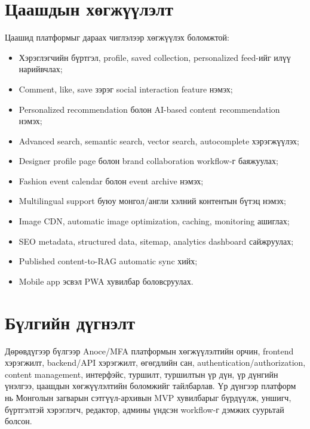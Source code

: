 \section{Цаашдын хөгжүүлэлт}
Цаашид платформыг дараах чиглэлээр хөгжүүлэх боломжтой:
\begin{itemize}
  \item Хэрэглэгчийн бүртгэл, profile, saved collection, personalized feed-ийг илүү нарийвчлах;
  \item Comment, like, save зэрэг social interaction feature нэмэх;
  \item Personalized recommendation болон AI-based content recommendation нэмэх;
  \item Advanced search, semantic search, vector search, autocomplete хэрэгжүүлэх;
  \item Designer profile page болон brand collaboration workflow-г баяжуулах;
  \item Fashion event calendar болон event archive нэмэх;
  \item Multilingual support буюу монгол/англи хэлний контентын бүтэц нэмэх;
  \item Image CDN, automatic image optimization, caching, monitoring ашиглах;
  \item SEO metadata, structured data, sitemap, analytics dashboard сайжруулах;
  \item Published content-to-RAG automatic sync хийх;
  \item Mobile app эсвэл PWA хувилбар боловсруулах.
\end{itemize}

\section*{Бүлгийн дүгнэлт}

Дөрөвдүгээр бүлгээр Anoce/MFA платформын хөгжүүлэлтийн орчин, frontend хэрэгжилт, backend/API хэрэгжилт, өгөгдлийн сан, authentication/authorization, content management, интерфэйс, туршилт, туршилтын үр дүн, үр дүнгийн үнэлгээ, цаашдын хөгжүүлэлтийн боломжийг тайлбарлав. Үр дүнгээр платформ нь Монголын загварын сэтгүүл-архивын MVP хувилбарыг бүрдүүлж, уншигч, бүртгэлтэй хэрэглэгч, редактор, админы үндсэн workflow-г дэмжих суурьтай болсон.

